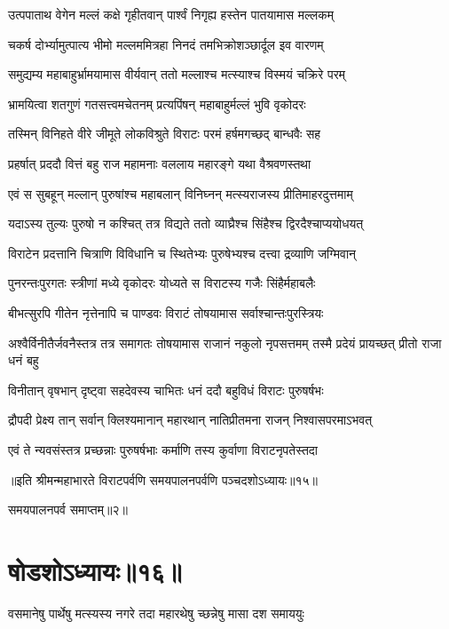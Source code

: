 \twolineshloka
{उत्पपाताथ वेगेन मल्लं कक्षे गृहीतवान्}
{पार्श्वं निगृह्य हस्तेन पातयामास मल्लकम्}


\twolineshloka
{चकर्ष दोर्भ्यामुत्पात्य भीमो मल्लममित्रहा}
{निनदं तमभिक्रोशञ्छार्दूल इव वारणम्}


\twolineshloka
{समुद्यम्य महाबाहुर्भ्रामयामास वीर्यवान्}
{ततो मल्लाश्च मत्स्याश्च विस्मयं चक्रिरे परम्}


\twolineshloka
{भ्रामयित्वा शतगुणं गतसत्त्वमचेतनम्}
{प्रत्यपिंषन् महाबाहुर्मल्लं भुवि वृकोदरः}


\twolineshloka
{तस्मिन् विनिहते वीरे जीमूते लोकविश्रुते}
{विराटः परमं हर्षमगच्छद् बान्धवैः सह}


\twolineshloka
{प्रहर्षात् प्रददौ वित्तं बहु राज महामनाः}
{वललाय महारङ्गे यथा वैश्रवणस्तथा}


\twolineshloka
{एवं स सुबहून् मल्लान् पुरुषांश्च महाबलान्}
{विनिघ्नन् मत्स्यराजस्य प्रीतिमाहरदुत्तमाम्}


\twolineshloka
{यदाऽस्य तुल्यः पुरुषो न कश्चित् तत्र विद्यते}
{ततो व्याघ्रैश्च सिंहैश्च द्विरदैश्चाप्ययोधयत्}


\twolineshloka
{विराटेन प्रदत्तानि चित्राणि विविधानि च}
{स्थितेभ्यः पुरुषेभ्यश्च दत्त्वा द्रव्याणि जग्मिवान्}


\twolineshloka
{पुनरन्तःपुरगतः स्त्रीणां मध्ये वृकोदरः}
{योध्यते स विराटस्य गजैः सिंहैर्महाबलैः}


\twolineshloka
{बीभत्सुरपि गीतेन नृत्तेनापि च पाण्डवः}
{विराटं तोषयामास सर्वाश्चान्तःपुरस्त्रियः}


\threelineshloka
{अश्वैर्विनीतैर्जवनैस्तत्र तत्र समागतः}
{तोषयामास राजानं नकुलो नृपसत्तमम्}
{तस्मै प्रदेयं प्रायच्छत् प्रीतो राजा धनं बहु}


\twolineshloka
{विनीतान् वृषभान् दृष्ट्वा सहदेवस्य चाभितः}
{धनं ददौ बहुविधं विराटः पुरुषर्षभः}


\twolineshloka
{द्रौपदी प्रेक्ष्य तान् सर्वान् क्लिश्यमानान् महारथान्}
{नातिप्रीतमना राजन् निश्वासपरमाऽभवत्}


\twolineshloka
{एवं ते न्यवसंस्तत्र प्रच्छन्नाः पुरुषर्षभाः}
{कर्माणि तस्य कुर्वाणा विराटनृपतेस्तदा}

॥इति श्रीमन्महाभारते विराटपर्वणि समयपालनपर्वणि पञ्चदशोऽध्यायः॥१५॥ 

समयपालनपर्व समाप्तम्॥२॥

\chapter{षोडशोऽध्यायः॥१६॥}

\twolineshloka
{वसमानेषु पार्थेषु मत्स्यस्य नगरे तदा}
{महारथेषु च्छन्नेषु मासा दश समाययुः}


